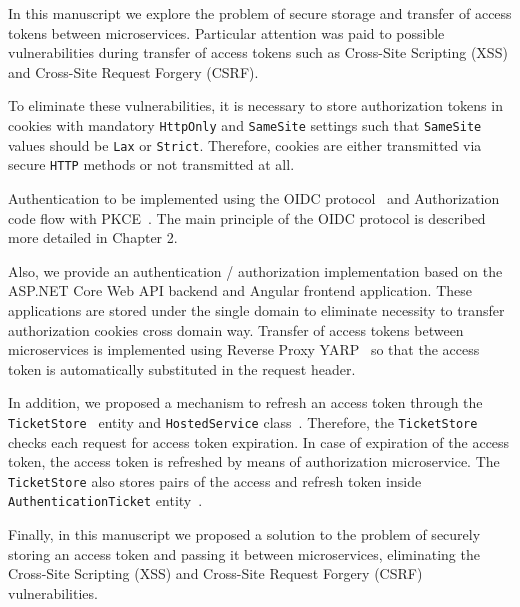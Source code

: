 In this manuscript we explore the problem of secure storage and transfer of access tokens between microservices.
Particular attention was paid to possible vulnerabilities during transfer of access tokens such
as Cross-Site Scripting (XSS) and Cross-Site Request Forgery (CSRF).

To eliminate these vulnerabilities, it is necessary to store authorization tokens in cookies with mandatory
\texttt{HttpOnly} and \texttt{SameSite} settings such that \texttt{SameSite} values should be \texttt{Lax} or \texttt{Strict}.
Therefore, cookies are either transmitted via secure \texttt{HTTP} methods or not transmitted at all.

Authentication to be implemented using the OIDC protocol~\cite{siriwardenaOpenid2020, sakimuraOpenid2014}
and Authorization code flow with PKCE~\cite{bradley2015rfc}.
The main principle of the OIDC protocol is described more detailed in Chapter 2.

Also, we provide an authentication / authorization implementation based on the ASP.NET Core Web API backend and Angular
frontend application.
These applications are stored under the single domain to eliminate necessity to transfer authorization cookies cross domain way.
Transfer of access tokens between microservices is implemented using Reverse Proxy YARP~\cite{microsoftYarp2021} so that
the access token is automatically substituted in the request header.

In addition, we proposed a mechanism to refresh an access token through the
\texttt{TicketStore}~\cite{microsoftIticketstore2023} entity
and \texttt{HostedService} class~\cite{microsoftHostedservice2023}.
Therefore, the \texttt{TicketStore} checks each request for access token expiration.
In case of expiration of the access token, the access token is refreshed by means of authorization microservice.
The \texttt{TicketStore} also stores pairs of the access and refresh token inside
\texttt{AuthenticationTicket} entity~\cite{microsoftAuthenticationTicket2023}.

Finally, in this manuscript we proposed a solution to the problem of securely storing an access token and passing it between microservices,
eliminating the Cross-Site Scripting (XSS) and Cross-Site Request Forgery (CSRF) vulnerabilities.